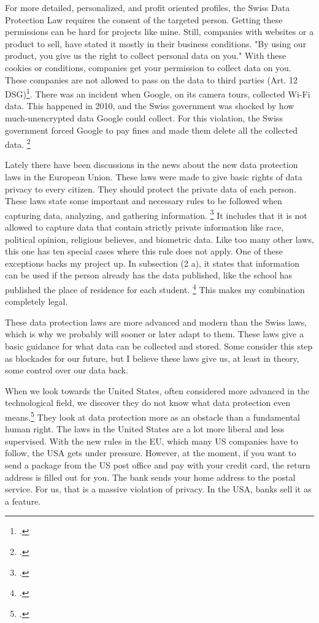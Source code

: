 \documentclass[paper=a4, fontsize=11pt]{article}
\begin{document}
For more detailed, personalized, and profit oriented profiles, the Swiss Data Protection Law requires the consent of the targeted person. Getting these permissions can be hard for projects like mine. Still, companies with websites or a product to sell, have stated it mostly in their business conditions. "By using our product, you give us the right to collect personal data on you."
With these cookies or conditions, companies get your permission to collect data on you. These companies are not allowed to pass on the data to third parties (Art. 12 DSG)\footcite{swissdataprotection}. There was an incident when Google, on its camera tours, collected Wi-Fi data. This happened in 2010, and the Swiss government was shocked by how much-unencrypted data Google could collect. For this violation, the Swiss government forced Google to pay fines and made them delete all the collected data. \footcite{googleadmin}


Lately there have been discussions in the news about the new data protection laws in the European Union. These laws were made to give basic rights of data privacy to every citizen. They should protect the private data of each person. These laws state some important and necessary rules to be followed when capturing data, analyzing, and gathering information. \footcite{dsgvo}
It includes that it is not allowed to capture data that contain strictly private information like race, political opinion, religious believes, and biometric data. Like too many other laws, this one has ten special cases where this rule does not apply. One of these exceptions backs my project up. In subsection (2 a), it states that information can be used if the person already has the data published, like the school has published the place of residence for each student. \footcite{dsgvoart9}
This makes my combination completely legal.

These data protection laws are more advanced and modern than the Swiss laws, which is why we probably will sooner or later adapt to them. These laws give a basic guidance for what data can be collected and stored. Some consider this step as blockades for our future, but I believe these laws give us, at least in theory, some control over our data back.

When we look towards the United States, often considered more advanced in the technological field, we discover they do not know what data protection even means.\footcite{usdataprotection} They look at data protection more as an obstacle than a fundamental human right.
The laws in the United States are a lot more liberal and less supervised. With the new rules in the EU, which many US companies have to follow, the USA gets under pressure. However, at the moment, if you want to send a package from the US post office and pay with your credit card, the return address is filled out for you. The bank sends your home address to the postal service. For us, that is a massive violation of privacy. In the USA, banks sell it as a feature.
\end{document}
